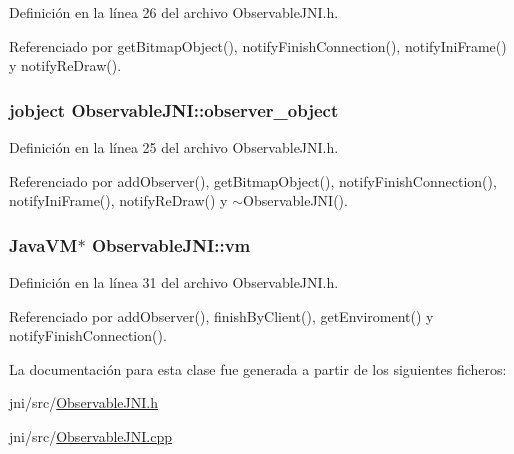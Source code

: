 Definición en la línea 26 del archivo Observable\-J\-N\-I.\-h.



Referenciado por get\-Bitmap\-Object(), notify\-Finish\-Connection(), notify\-Ini\-Frame() y notify\-Re\-Draw().

\hypertarget{classObservableJNI_a83ba449601906c8683fceabb2d99794e}{
\subsubsection[{observer\-\_\-object}]{\setlength{\rightskip}{0pt plus 5cm}jobject Observable\-J\-N\-I\-::observer\-\_\-object\hspace{0.3cm}{\ttfamily [private]}}}\label{classObservableJNI_a83ba449601906c8683fceabb2d99794e}


Definición en la línea 25 del archivo Observable\-J\-N\-I.\-h.



Referenciado por add\-Observer(), get\-Bitmap\-Object(), notify\-Finish\-Connection(), notify\-Ini\-Frame(), notify\-Re\-Draw() y $\sim$\-Observable\-J\-N\-I().

\hypertarget{classObservableJNI_addca6d6dd302fd9902108a7f0941556a}{
\subsubsection[{vm}]{\setlength{\rightskip}{0pt plus 5cm}Java\-V\-M$\ast$ Observable\-J\-N\-I\-::vm\hspace{0.3cm}{\ttfamily [private]}}}\label{classObservableJNI_addca6d6dd302fd9902108a7f0941556a}


Definición en la línea 31 del archivo Observable\-J\-N\-I.\-h.



Referenciado por add\-Observer(), finish\-By\-Client(), get\-Enviroment() y notify\-Finish\-Connection().



La documentación para esta clase fue generada a partir de los siguientes ficheros\-:\begin{DoxyCompactItemize}
\item 
jni/src/\hyperlink{ObservableJNI_8h}{Observable\-J\-N\-I.\-h}\item 
jni/src/\hyperlink{ObservableJNI_8cpp}{Observable\-J\-N\-I.\-cpp}\end{DoxyCompactItemize}
